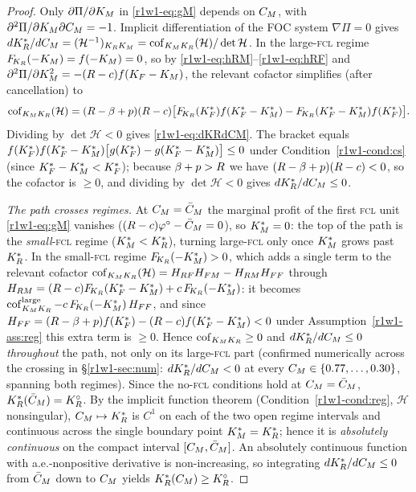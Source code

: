 \begin{proof}
Only $\partial\Pi/\partial K_M$ in \eqref{r1w1-eq:gM} depends on $C_M$, with
$\partial^2\Pi/\partial K_M\partial C_M=-1$. Implicit differentiation of the FOC
system $\nabla\Pi=0$ gives
$dK_R^{*}/dC_M=(\mathcal H^{-1})_{K_RK_M}
   =\operatorname{cof}_{K_MK_R}(\mathcal H)/\det\mathcal H$.
In the large-\textsc{fcl} regime $F_{\!K_R}(-K_M)=f(-K_M)=0$, so by
\eqref{r1w1-eq:hRM}--\eqref{r1w1-eq:hRF} and $\partial^2\Pi/\partial K_M^2=-(R-c)f(K_F-K_M)$,
the relevant cofactor simplifies (after cancellation) to
\[
  \operatorname{cof}_{K_MK_R}(\mathcal H)
  =(R-\beta+p)(R-c)\big[F_{\!K_R}(K_F^{*})f(K_F^{*}-K_M^{*})-F_{\!K_R}(K_F^{*}-K_M^{*})f(K_F^{*})\big].
\]
Dividing by $\det\mathcal H<0$ gives \eqref{r1w1-eq:dKRdCM}. The bracket equals
$f(K_F^{*})f(K_F^{*}-K_M^{*})\big[g(K_F^{*})-g(K_F^{*}-K_M^{*})\big]\le 0$ under
Condition~\ref{r1w1-cond:cs} (since $K_F^{*}-K_M^{*}<K_F^{*}$); because $\beta+p>R$ we have
$(R-\beta+p)(R-c)<0$, so the cofactor is $\ge0$, and dividing by $\det\mathcal H<0$
gives $dK_R^{*}/dC_M\le0$.

\emph{The path crosses regimes.} At $C_M=\bar C_M$ the marginal profit of the first
\textsc{fcl} unit \eqref{r1w1-eq:gM} vanishes ($(R-c)\varphi^{\circ}-\bar C_M=0$), so
$K_M^{*}=0$: the top of the path is the \emph{small}-\textsc{fcl} regime
($K_M^{*}<K_R^{*}$), turning large-\textsc{fcl} only once $K_M^{*}$ grows past $K_R^{*}$. In
the small-\textsc{fcl} regime $F_{\!K_R}(-K_M^{*})>0$, which adds a single term to the
relevant cofactor $\operatorname{cof}_{K_MK_R}(\mathcal H)=H_{RF}H_{FM}-H_{RM}H_{FF}$
through $H_{RM}=(R-c)F_{\!K_R}(K_F^{*}-K_M^{*})+c\,F_{\!K_R}(-K_M^{*})$: it becomes
$\operatorname{cof}_{K_MK_R}^{\text{large}}-c\,F_{\!K_R}(-K_M^{*})\,H_{FF}$, and since
$H_{FF}=(R-\beta+p)f(K_F^{*})-(R-c)f(K_F^{*}-K_M^{*})<0$ under Assumption~\ref{r1w1-ass:reg} this
extra term is $\ge0$. Hence $\operatorname{cof}_{K_MK_R}\ge0$ and $dK_R^{*}/dC_M\le0$
\emph{throughout} the path, not only on its large-\textsc{fcl} part (confirmed
numerically across the crossing in \S\ref{r1w1-sec:num}: $dK_R^{*}/dC_M<0$ at every
$C_M\in\{0.77,\dots,0.30\}$, spanning both regimes). Since the no-\textsc{fcl}
conditions hold at $C_M=\bar C_M$, $K_R^{*}(\bar C_M)=K_R^{\circ}$. By the implicit function
theorem (Condition~\ref{r1w1-cond:reg}, $\mathcal H$ nonsingular), $C_M\mapsto K_R^{*}$ is
$C^1$ on each of the two open regime intervals and continuous across the single
boundary point $K_M^{*}=K_R^{*}$; hence it is \emph{absolutely continuous} on the
compact interval $[C_M,\bar C_M]$. An absolutely continuous function with
a.e.-nonpositive derivative is non-increasing, so integrating
$dK_R^{*}/dC_M\le0$ from $\bar C_M$ down to $C_M$ yields $K_R^{*}(C_M)\ge K_R^{\circ}$.
\end{proof}

